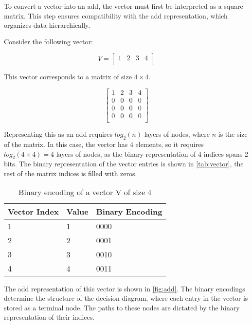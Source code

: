 To convert a vector into an \gls{add}, the vector must first be interpreted as a square matrix.
This step ensures compatibility with the \gls{add} representation, which organizes data hierarchically.

Consider the following vector:

\[
    V=
    \begin{bmatrix}
        1 & 2 & 3 & 4 \\
    \end{bmatrix}
\]

This vector corresponds to a matrix of size $4 \times 4$.

\[
    \begin{bmatrix}
        1 & 2 & 3 & 4 \\
        0 & 0 & 0 & 0 \\
        0 & 0 & 0 & 0 \\
        0 & 0 & 0 & 0 \\
    \end{bmatrix}
\]

Representing this as an \gls{add} requires $log_2(n)$ layers of nodes, where $n$ is the size of the matrix.
In this case, the vector has 4 elements, so it requires $log_2(4 \times 4) = 4$ layers of nodes, as the binary representation of 4 indices spans 2 bits.
The binary representation of the vector entries is shown in \autoref{tab:vector}, the rest of the matrix indices is filled with zeros.

\begin{table}
    \centering
    \caption{Binary encoding of a vector V of size 4}
    \label{tab:vector}
    \begin{tabular}{lll}
        \toprule
        Vector Index & Value & Binary Encoding \\
        \midrule
        1            & 1     & 0000            \\
        2            & 2     & 0001            \\
        3            & 3     & 0010            \\
        4            & 4     & 0011            \\
        \bottomrule
    \end{tabular}
\end{table}

The \gls{add} representation of this vector is shown in \autoref{fig:add}.
The binary encodings determine the structure of the decision diagram, where each entry in the vector is stored as a terminal node.
The paths to these nodes are dictated by the binary representation of their indices.

